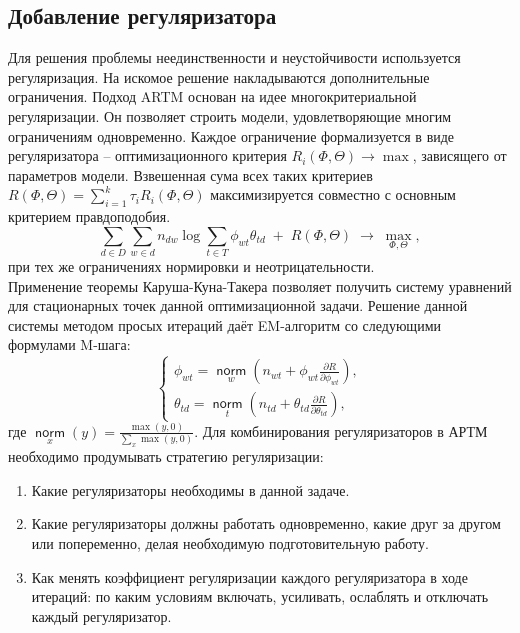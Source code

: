 \documentclass[12pt]{article}
\newcommand{\norm}{\mathop{\mathsf{norm}}\limits}
\begin{document}
	\subsection{Добавление регуляризатора}
Для решения проблемы неединственности и неустойчивости используется регуляризация. На искомое решение накладываются дополнительные ограничения. Подход ARTM \cite{artmdef1, artmdef2, artmdef3} основан на идее многокритериальной регуляризации. Он позволяет строить модели, удовлетворяющие многим ограничениям одновременно. Каждое ограничение формализуется в виде регуляризатора -- оптимизационного критерия $R_i(\Phi,\Theta)\to\max$, зависящего от параметров модели. Взвешенная сума всех таких критериев $R(\Phi,\Theta) = \sum_{i=1}^k \tau_i R_i(\Phi,\Theta)$ максимизируется совместно с основным критерием правдоподобия.
\[
\sum_{d\in D} \sum_{w\in d} n_{dw}\log \sum_{t\in T} \phi_{wt}\theta_{td} \;+\; R(\Phi,\Theta)\;\to\; \max_{\Phi,\Theta},
\]
при тех же ограничениях нормировки и неотрицательности.\\
Применение теоремы Каруша-Куна-Такера позволяет получить систему уравнений для стационарных точек данной оптимизационной задачи. Решение данной системы методом просых итераций даёт EM-алгоритм со следующими формулами M-шага:
\[
\left\{
	\begin{aligned}
\phi_{wt} = \norm_w  \left(n_{wt} + \phi_{wt}\frac{\partial R}{\partial\phi_{wt}}\right),\\
\theta_{td} = \norm_t  \left(n_{td} + \theta_{td}\frac{\partial R}{\partial\theta_{td}}\right),
	\end{aligned}
\right.
\]
где $\norm_x(y) = \frac{\max(y, 0)}{\sum\limits_x \max(y, 0)}$.
Для комбинирования регуляризаторов в АРТМ необходимо продумывать стратегию регуляризации:
\begin{enumerate}
\item Какие регуляризаторы необходимы в данной задаче.
\item Какие регуляризаторы должны работать одновременно, какие друг за другом или попеременно, делая необходимую подготовительную работу.
\item Как менять коэффициент регуляризации каждого регуляризатора в ходе итераций: по каким условиям включать, усиливать, ослаблять и отключать каждый регуляризатор.
\end{enumerate}
\end{document}
